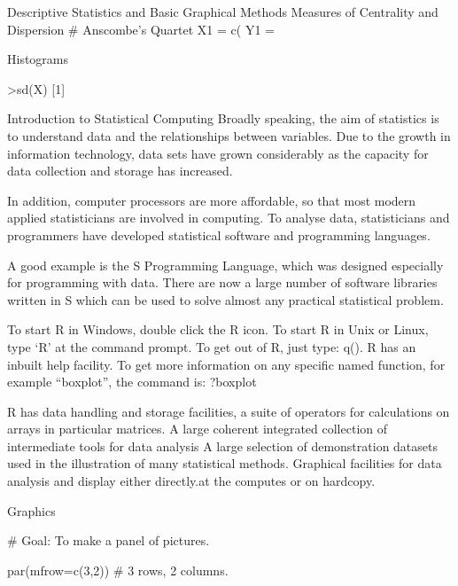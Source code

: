 Descriptive Statistics and Basic Graphical Methods
Measures of Centrality and Dispersion
# Anscombe’s  Quartet
X1 = c(
Y1 =

Histograms
 
>sd(X)
[1]
 
Introduction to Statistical Computing
Broadly speaking, the aim of statistics is to understand data and the relationships between variables. Due to the growth in information technology, data sets have grown considerably as the capacity for data collection and storage has increased.
 
In addition, computer processors are more affordable, so that most modern applied statisticians are involved in computing. To analyse data, statisticians and programmers have developed statistical software and
programming languages.
 
A good example is the S Programming Language, which was designed especially for programming with data. There are now a large number of software libraries written in S which can be used to solve almost any practical statistical problem.
 
To start R in Windows, double click the R icon. To start R in Unix or Linux, type ‘R’ at the command prompt. To get out of R, just type: q().
R has an inbuilt help facility. To get more information on any specific named
function, for example “boxplot”, the command is:
?boxplot
 
 
R has data handling and storage facilities, a suite of operators for calculations on arrays in particular matrices. A large coherent integrated collection of intermediate tools for data analysis
A large selection of demonstration datasets used in the illustration of many statistical methods.
Graphical facilities for data analysis and display either directly.at the computes or on hardcopy.
 
 
 
 




Graphics

# Goal: To make a panel of pictures.

par(mfrow=c(3,2))                       # 3 rows, 2 columns.


